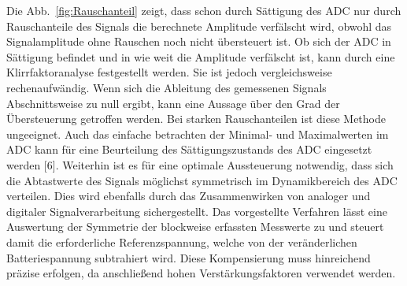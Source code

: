 
Die Abb.~\ref{fig:Rauschanteil} zeigt, dass schon durch Sättigung des ADC nur durch Rauschanteile des Signals die berechnete Amplitude verfälscht wird, obwohl das Signalamplitude ohne Rauschen noch nicht übersteuert ist. Ob sich der ADC in Sättigung befindet und in wie weit die Amplitude verfälscht ist, kann durch eine Klirrfaktoranalyse festgestellt werden. Sie ist jedoch vergleichsweise rechenaufwändig.  
Wenn sich die Ableitung des gemessenen Signals Abschnittsweise zu null ergibt, kann eine Aussage über den Grad der Übersteuerung getroffen werden. Bei starken Rauschanteilen ist diese Methode ungeeignet. Auch das einfache betrachten der Minimal- und Maximalwerten im ADC kann für eine Beurteilung des Sättigungszustands des ADC eingesetzt werden [6].
Weiterhin ist es für eine optimale Aussteuerung notwendig, dass sich die Abtastwerte des Signals möglichst symmetrisch im Dynamikbereich des ADC verteilen. Dies wird ebenfalls durch das Zusammenwirken von analoger und digitaler Signalverarbeitung sichergestellt. Das vorgestellte Verfahren lässt eine Auswertung der Symmetrie der blockweise erfassten Messwerte zu und steuert damit die erforderliche Referenzspannung, welche von der veränderlichen Batteriespannung subtrahiert wird. Diese Kompensierung muss hinreichend präzise erfolgen, da anschließend hohen Verstärkungsfaktoren verwendet werden. 

